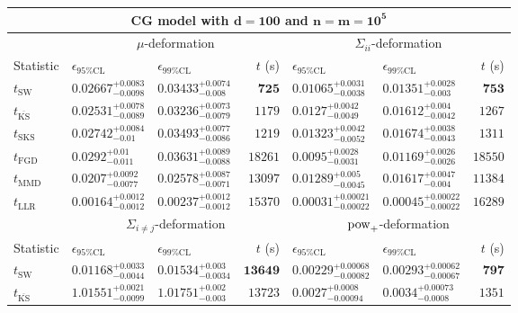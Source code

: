 \begin{tabular}{l|llr|llr}
	\toprule
	\multicolumn{7}{c}{{\bf CG model with $\mathbf{d=100}$ and $\mathbf{n=m=10^{5}}$}} \\
	\toprule
	\multicolumn{1}{c}{} & \multicolumn{3}{c}{$\mu$-deformation} & \multicolumn{3}{c}{$\Sigma_{ii}$-deformation} \\
	Statistic & $\epsilon_{95\%\mathrm{CL}}$ & $\epsilon_{99\%\mathrm{CL}}$ & $t$ (s) & $\epsilon_{95\%\mathrm{CL}}$ & $\epsilon_{99\%\mathrm{CL}}$ & $t$ (s) \\
	\midrule
	$t_{\mathrm{SW}}$ & $0.02667_{-0.0098}^{+0.0083}$ & $0.03433_{-0.008}^{+0.0074}$ & ${\mathbf{725}}$ & $0.01065_{-0.0038}^{+0.0031}$ & $0.01351_{-0.003}^{+0.0028}$ & ${\mathbf{753}}$ \\
	$t_{\overline{\mathrm{KS}}}$ & $0.02531_{-0.0089}^{+0.0078}$ & $0.03236_{-0.0079}^{+0.0073}$ & $1179$ & $0.0127_{-0.0049}^{+0.0042}$ & $0.01612_{-0.0042}^{+0.004}$ & $1267$ \\
	$t_{\mathrm{SKS}}$ & $0.02742_{-0.01}^{+0.0084}$ & $0.03493_{-0.0086}^{+0.0077}$ & $1219$ & $0.01323_{-0.0052}^{+0.0042}$ & $0.01674_{-0.0043}^{+0.0038}$ & $1311$ \\
	$t_{\mathrm{FGD}}$ & $0.0292_{-0.011}^{+0.01}$ & $0.03631_{-0.0088}^{+0.0089}$ & $18261$ & ${\mathbf{0.0095_{-0.0031}^{+0.0028}}}$ & ${\mathbf{0.01169_{-0.0026}^{+0.0026}}}$ & $18550$ \\
	$t_{\mathrm{MMD}}$ & ${\mathbf{0.0207_{-0.0077}^{+0.0092}}}$ & ${\mathbf{0.02578_{-0.0071}^{+0.0087}}}$ & $13097$ & $0.01289_{-0.0045}^{+0.005}$ & $0.01617_{-0.004}^{+0.0047}$ & $11384$ \\
	$t_{\mathrm{LLR}}$ & $0.00164_{-0.0012}^{+0.0012}$ & $0.00237_{-0.0012}^{+0.0012}$ & $15370$ & $0.00031_{-0.00022}^{+0.00021}$ & $0.00045_{-0.00022}^{+0.00022}$ & $16289$ \\
	\toprule
	\multicolumn{1}{c}{} & \multicolumn{3}{c}{$\Sigma_{i\neq j}$-deformation} & \multicolumn{3}{c}{$\rm{pow}_{+}$-deformation} \\
	Statistic & $\epsilon_{95\%\mathrm{CL}}$ & $\epsilon_{99\%\mathrm{CL}}$ & $t$ (s) & $\epsilon_{95\%\mathrm{CL}}$ & $\epsilon_{99\%\mathrm{CL}}$ & $t$ (s) \\
	\midrule
	$t_{\mathrm{SW}}$ & $0.01168_{-0.0044}^{+0.0033}$ & $0.01534_{-0.0034}^{+0.003}$ & ${\mathbf{13649}}$ & $0.00229_{-0.00082}^{+0.00068}$ & $0.00293_{-0.00067}^{+0.00062}$ & ${\mathbf{797}}$ \\
	$t_{\overline{\mathrm{KS}}}$ & $1.01551_{-0.0099}^{+0.0021}$ & $1.01751_{-0.003}^{+0.002}$ & $13723$ & $0.0027_{-0.00094}^{+0.0008}$ & $0.0034_{-0.0008}^{+0.00073}$ & $1351$ \\

\end{tabular}
